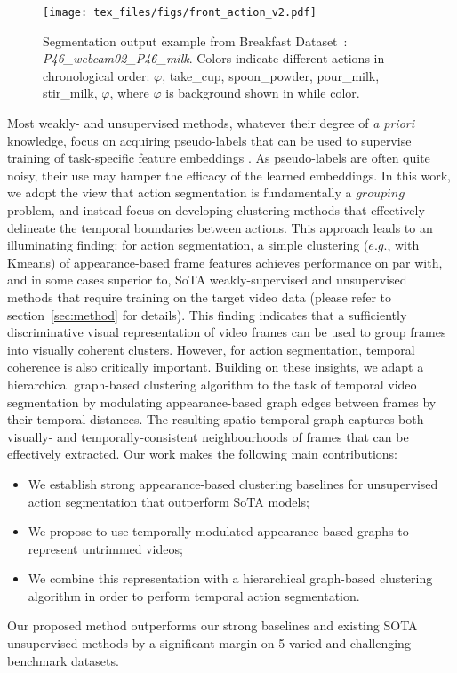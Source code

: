 \documentclass[10pt,twocolumn,letterpaper]{article}
\begin{document}
\begin{figure*}[hbt]
\centering
\texttt{[image: tex\_files/figs/front\_action\_v2.pdf]}

\caption{Segmentation output example from Breakfast Dataset~\cite{ute_15}: \textit{P46\_webcam02\_P46\_milk}.  Colors indicate different actions in chronological order:  $\varphi$, take\_cup, spoon\_powder, pour\_milk, stir\_milk, $\varphi$, where $\varphi$ is background shown in while color.\label{fig:teaser} }
\vspace{-0.3cm}
\end{figure*}


Most weakly- and unsupervised methods, whatever their degree of \textit{a priori} knowledge, focus on acquiring pseudo-labels that can be used to supervise training of task-specific feature embeddings \cite{cdfl,mallow,ute_7,ute_24,nnv,mucon}. As pseudo-labels are often quite noisy, their use may hamper the efficacy of the learned embeddings. In this work, we adopt the view that action segmentation is fundamentally a $grouping$ problem, and instead focus on developing clustering methods that effectively delineate the temporal boundaries between actions. This approach leads to an illuminating finding: for action segmentation, a simple clustering ($e.g.$, with Kmeans) of appearance-based frame features achieves performance on par with, and in some cases superior to, SoTA weakly-supervised and unsupervised methods that require training on the target video data (please refer to section~\ref{sec:method} for details).
This finding indicates that a sufficiently discriminative visual representation of video frames can be used to group frames into visually coherent clusters.
However, for action segmentation, temporal coherence is also critically important.
Building on these insights, we adapt a hierarchical graph-based clustering algorithm to the task of temporal video segmentation by modulating appearance-based graph edges between frames by their temporal distances. The resulting spatio-temporal graph captures both visually- and temporally-consistent neighbourhoods of frames that can be effectively extracted.
Our work makes the following main contributions:
\begin{itemize}
    \item We establish strong appearance-based clustering baselines for unsupervised action segmentation that outperform SoTA models;
    \item We propose to use temporally-modulated appearance-based graphs to represent untrimmed videos;
    \item We combine this representation with a hierarchical graph-based clustering algorithm in order to perform temporal action segmentation.
\end{itemize}
Our proposed method outperforms our strong baselines and existing SOTA unsupervised methods by a significant margin on 5 varied and challenging benchmark datasets.
\end{document}

